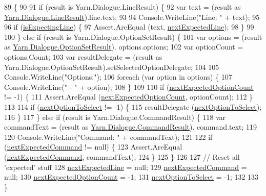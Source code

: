 \begin{DoxyCode}
89                                                                        \{
90 
91             \textcolor{keywordflow}{if} (result is Yarn.Dialogue.LineResult) \{
92                 var text = (result as \hyperlink{a00106}{Yarn.Dialogue.LineResult}).line.text;
93 
94                 Console.WriteLine(\textcolor{stringliteral}{"Line: "} + text);
95 
96                 \textcolor{keywordflow}{if} (\hyperlink{a00146_a47f35b8e8123ed9471883d02b8bc9f3e}{isExpectingLine}) \{
97                     Assert.AreEqual (text, \hyperlink{a00146_a3651ffb5425ab15bd1e42749347c1ee7}{nextExpectedLine});
98                 \}
99 
100             \} \textcolor{keywordflow}{else} \textcolor{keywordflow}{if} (result is Yarn.Dialogue.OptionSetResult) \{
101                 var options = (result as \hyperlink{a00119}{Yarn.Dialogue.OptionSetResult}).
      options.options;
102                 var optionCount = options.Count;
103                 var resultDelegate = (result as Yarn.Dialogue.OptionSetResult).setSelectedOptionDelegate;
104 
105                 Console.WriteLine(\textcolor{stringliteral}{"Options:"});
106                 \textcolor{keywordflow}{foreach} (var option \textcolor{keywordflow}{in} options) \{
107                     Console.WriteLine(\textcolor{stringliteral}{" - "} + option);
108                 \}
109 
110                 \textcolor{keywordflow}{if} (\hyperlink{a00146_aaabaf15249efe42f3d857129bdbc2864}{nextExpectedOptionCount} != -1) \{
111                     Assert.AreEqual (\hyperlink{a00146_aaabaf15249efe42f3d857129bdbc2864}{nextExpectedOptionCount}, optionCount);
112                 \}
113 
114                 \textcolor{keywordflow}{if} (\hyperlink{a00146_a343055fa693e9d5dfc1bdbfcd0f02676}{nextOptionToSelect} != -1) \{
115                     resultDelegate (\hyperlink{a00146_a343055fa693e9d5dfc1bdbfcd0f02676}{nextOptionToSelect});
116                 \}
117             \} \textcolor{keywordflow}{else} \textcolor{keywordflow}{if} (result is Yarn.Dialogue.CommandResult) \{
118                 var commandText = (result as \hyperlink{a00032}{Yarn.Dialogue.CommandResult}).
      command.text;
119 
120                 Console.WriteLine(\textcolor{stringliteral}{"Command: "} + commandText);
121 
122                 \textcolor{keywordflow}{if} (\hyperlink{a00146_a26fae5694fc06c3cdb12d3108dbc34de}{nextExpectedCommand} != null) \{
123                     Assert.AreEqual (\hyperlink{a00146_a26fae5694fc06c3cdb12d3108dbc34de}{nextExpectedCommand}, commandText);
124                 \}
125             \}
126 
127             \textcolor{comment}{// Reset all 'expected' stuff}
128             \hyperlink{a00146_a3651ffb5425ab15bd1e42749347c1ee7}{nextExpectedLine} = null;
129             \hyperlink{a00146_a26fae5694fc06c3cdb12d3108dbc34de}{nextExpectedCommand} = null;
130             \hyperlink{a00146_aaabaf15249efe42f3d857129bdbc2864}{nextExpectedOptionCount} = -1;
131             \hyperlink{a00146_a343055fa693e9d5dfc1bdbfcd0f02676}{nextOptionToSelect} = -1;
132 
133         \}
\end{DoxyCode}
